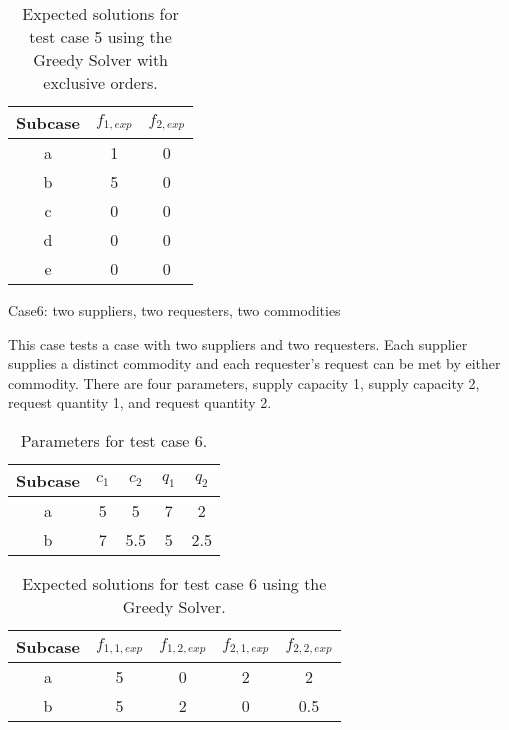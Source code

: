 \begin{table}[ht]
  \begin{center}
    \caption{Expected solutions for test case 5 using the Greedy Solver with 
      exclusive orders.}
    \begin{tabular}{ccc}
    \toprule
    Subcase & $f_{1, exp}$ & $f_{2, exp}$\\
    \midrule
    a & 1  & 0   \\
    b & 5  & 0   \\
    c & 0  & 0   \\
    d & 0  & 0   \\
    e & 0  & 0   \\
    \bottomrule
    \end{tabular}
  \end{center}
\end{table}

Case6: two suppliers, two requesters, two commodities

This case tests a case with two suppliers and two requesters. Each supplier
supplies a distinct commodity and each requester's request can be met by either
commodity. There are four parameters, supply capacity 1, supply capacity 2,
request quantity 1, and request quantity 2.

\begin{table}[ht]
  \begin{center}
    \caption{Parameters for test case 6.}
    \begin{tabular}{ccccc}
    \toprule
    Subcase & $c_1$ & $c_2$ & $q_1$ & $q_2$ \\
    \midrule
    a & 5  & 5   & 7 & 2   \\
    b & 7  & 5.5 & 5 & 2.5 \\
    \bottomrule
    \end{tabular}
  \end{center}
\end{table}


\begin{table}[ht]
  \begin{center}
    \caption{Expected solutions for test case 6 using the Greedy Solver.}
    \begin{tabular}{ccccc}
    \toprule
    Subcase & $f_{1, 1, exp}$ & $f_{1, 2, exp}$ 
    & $f_{2, 1, exp}$ & $f_{2, 2, exp}$ \\
    \midrule
    a & 5  & 0  & 2  & 2   \\
    b & 5  & 2  & 0  & 0.5 \\
    \bottomrule
    \end{tabular}
  \end{center}
\end{table}

